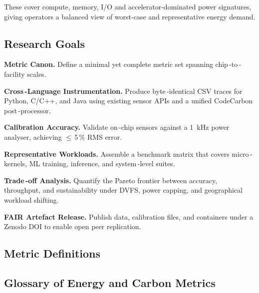 These cover compute, memory, I/O and accelerator‑dominated power
signatures, giving operators a balanced view of worst‑case and
representative energy demand.




\subsection{Research Goals}
\label{sec:energy:goals}
\begin{goal}
    \item \textbf{Metric Canon.} Define a minimal yet complete metric set spanning chip\,-to\,-facility scales.
    \item \textbf{Cross\,-Language Instrumentation.} Produce byte\,-identical CSV traces for Python, C/C++, and Java using existing sensor APIs and a unified CodeCarbon post\,-processor.
    \item \textbf{Calibration Accuracy.} Validate on\,-chip sensors against a \SI{1}{\kilo\hertz} power analyser, achieving $\leq$\,5\,\% RMS error.
    \item \textbf{Representative Workloads.} Assemble a benchmark matrix that covers micro\,-kernels, ML training, inference, and system\,-level suites.
    \item \textbf{Trade\,-off Analysis.} Quantify the Pareto frontier between accuracy, throughput, and sustainability under DVFS, power capping, and geographical workload shifting.
    \item \textbf{FAIR Artefact Release.} Publish data, calibration files, and containers under a Zenodo DOI to enable open peer replication.
\end{goal}

\subsection{Metric Definitions}
\label{sec:energy:metrics}

\subsection{Glossary of Energy and Carbon Metrics}
\label{sec:metrics:defs}

